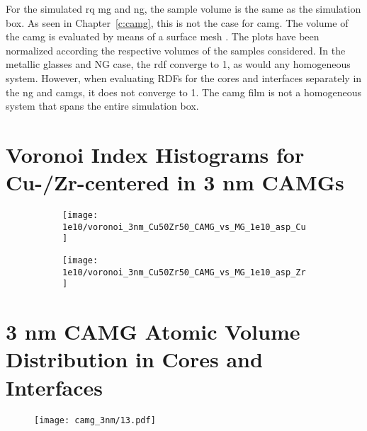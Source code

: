 For the simulated \gls{rq} \gls{mg} and \gls{ng}, the sample volume is the same as the simulation box. As seen in Chapter~\ref{c:camg}, this is not the case for \gls{camg}. The volume of the \gls{camg} is evaluated by means of a surface mesh \cite{Stukowski2014}. The plots have been normalized according the respective volumes of the samples considered. In the metallic glasses and NG case, the \gls{rdf} converge to 1, as would any homogeneous system. However, when evaluating RDFs for the cores and interfaces separately in the \gls{ng} and \gls{camg}s, it does not converge to 1. The \gls{camg} film is not a homogeneous system that spans the entire simulation box. 

\section{Voronoi Index Histograms for Cu-/Zr-centered in 3 nm CAMGs}
\begin{figure}[!h]
	\centering
	\begin{subfigure}{0.49\linewidth} \centering \texttt{[image: 1e10/voronoi\_3nm\_Cu50Zr50\_CAMG\_vs\_MG\_1e10\_asp\_Cu]} 
		\subcaption{} \end{subfigure}%
	\hfill
	\begin{subfigure}{0.49\linewidth} \centering \texttt{[image: 1e10/voronoi\_3nm\_Cu50Zr50\_CAMG\_vs\_MG\_1e10\_asp\_Zr]}
		\subcaption{} \end{subfigure}
	\label{f:voro_cu-zr}
\end{figure}

\clearpage
\section{3 nm CAMG Atomic Volume Distribution in Cores and Interfaces}
\begin{figure}[!h]
	\centering
	\texttt{[image: camg\_3nm/13.pdf]}
	\label{f:atvol}
\end{figure}


